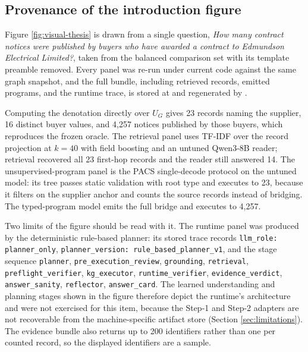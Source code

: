 \subsection{Provenance of the introduction figure}

Figure \ref{fig:visual-thesis} is drawn from a single question,
\emph{How many contract notices were published by buyers who have awarded a contract to Edmundson
Electrical Limited?}, taken from the balanced comparison set with its template preamble removed.
Every panel was re-run under current code against the same graph snapshot, and the full bundle,
including retrieved records, emitted programs, and the runtime trace, is stored at
 and regenerated by
.

Computing the denotation directly over $U_G$ gives 23 records naming the supplier, 16 distinct
buyer values, and 4{,}257 notices published by those buyers, which reproduces the frozen oracle.
The retrieval panel uses TF-IDF over the record projection at $k=40$ with field boosting and an
untuned Qwen3-8B reader; retrieval recovered all 23 first-hop records and the reader still
answered 14.  The unsupervised-program panel is the PACS single-decode protocol on the untuned
model: its tree passes static validation with root type \numbertype{} and executes to 23, because
it filters on the supplier anchor and counts the source records instead of bridging.  The
typed-program model emits the full bridge and executes to 4{,}257.

Two limits of the figure should be read with it.  The runtime panel was produced by the
deterministic rule-based planner: its stored trace records \texttt{llm\_role: planner\_only},
\texttt{planner\_version: rule\_based\_planner\_v1}, and the stage sequence \texttt{planner},
\texttt{pre\_execution\_review}, \texttt{grounding}, \texttt{retrieval},
\texttt{preflight\_verifier}, \texttt{kg\_executor}, \texttt{runtime\_verifier},
\texttt{evidence\_verdict}, \texttt{answer\_sanity}, \texttt{reflector}, \texttt{answer\_card}.
The learned understanding and planning stages shown in the figure therefore depict the runtime's
architecture and were not exercised for this item, because the Step-1 and Step-2 adapters are not
recoverable from the machine-specific artifact store (Section \ref{sec:limitations}).  The
evidence bundle also returns up to 200 identifiers rather than one per counted record, so the
displayed identifiers are a sample.
